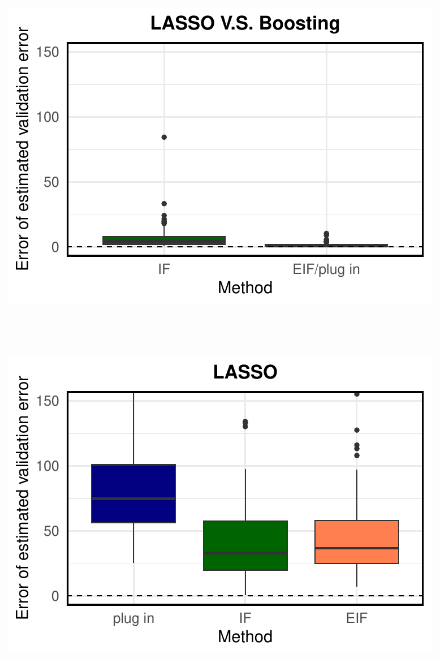 \begin{figure}[ht]
\begin{minipage}{0.3\textwidth}
                \includegraphics[clip, trim = 0cm 0cm 0cm 0cm, width = \textwidth]{plot/ACIC_linear_propensity_linear_HTE_estimator_error_LASSO_V.S._Boosting.pdf}
        \end{minipage}        
        \\
        \begin{minipage}{0.3\textwidth}
                \centering
                \includegraphics[clip, trim = 0cm 0cm 0cm 0cm, width = \textwidth]{plot/ACIC_linear_propensity_nonlinear_HTE_estimator_error_LASSO.pdf}
        \end{minipage}
        \begin{minipage}{0.3\textwidth}
                \centering

\end{minipage}
\end{figure}

